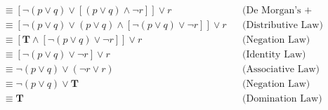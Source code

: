 \begin{itemize}
\begin{enumerate}[a.]
\begin{align*}
                         & \equiv [\neg(p \lor q) \lor [(p \lor q) \land \neg r]] \lor r                     &  & \text{(De Morgan’s + Double Negation)} \\
                         & \equiv [\neg(p \lor q) \lor (p \lor q) \land [\neg(p \lor q) \lor \neg r]] \lor r &  & \text{(Distributive Law)}              \\
                         & \equiv [\mathbf{T} \land [\neg(p \lor q) \lor \neg r]] \lor r                     &  & \text{(Negation Law)}                  \\
                         & \equiv [\neg(p \lor q) \lor \neg r] \lor r                                        &  & \text{(Identity Law)}                  \\
                         & \equiv \neg(p \lor q) \lor (\neg r \lor r)                                        &  & \text{(Associative Law)}               \\
                         & \equiv \neg(p \lor q) \lor \mathbf{T}                                             &  & \text{(Negation Law)}                  \\
                         & \equiv \mathbf{T}                                                                 &  & \text{(Domination Law)}
                    \end{align*}
          \end{enumerate}
\end{itemize}

